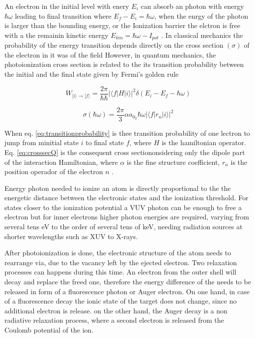 An electron in the initial level with enery $E_{i}$ can absorb an photon with energy $\hbar \omega$ leading to final transition where $E_{f}-E_{i}=\hbar \omega$, when the enrgy of the photon is larger than the bounding energy, or the Ionization barrier the elctron is free with a the remainin kinetic energy $E_{kin} = \hbar \omega - I_{pot}$ \cite{becker_vuv_1996}.
In classical mechanics the probability of the energy transition depends directly on the cross section $(\sigma)$ of the electron in it was of the field However,  in  quantum  mechanics,  the photoionization cross section is related to the its transition probability between the initial and the final state given by Fermi’s golden rule

 \begin{equation} \label{eq:transitionprobability}
W_{|i\rangle \rightarrow |f\rangle} = \frac{2\pi}{\hbar\hbar} |\langle f|H|i\rangle|^{2} \delta(E_{i} - E_{f}-\hbar\omega)
 \end{equation}
 
 \begin{equation}\label{eq:crosssecQ}
 \sigma(\hbar\omega) = \dfrac{2\pi}{3} \alpha a_{0}_{2} \hbar\omega |\langle f|r_{n}|i\rangle|^{2}
 \end{equation}
 


When eq. \ref{eq:transitionprobability} is thee transition probability of one lectron to jump from minitial state $i$ to final state $f$, where $H$ is the hamiltonian operator. Eq. \ref{eq:crosssecQ} is the consequent cross sectiononsidering only the dipole part of the interaction Hamiltonian, where $\alpha$ is the fine structure coefficient, $r_{n}$ is the position operador of the electron $n$ \cite{fermi_quantum_1932}.

Energy photon needed to ionize an atom is directly proportional to the  the energetic distance between the electronic states and the ionization threshold. For  states closer to the ionization potential a  VUV photon can be enough to free a electron but for inner electrons  higher photon energies are required, varying from several tens eV to the order of several tens of keV, needing radiation sources at shorter wavelengths such as XUV to X-rays.\cite{becker_vuv_1996}

After photoionization is done, the electronic structure of the atom needs to rearrange via, due to the vacancy left by the ejected electron. Two relaxation processes can happens during this time. An electron from the outer shell will decay and replace the freed one, therefore the energy difference of the needs to be released in form of a fluorescence photon or Auger electron. On one hand, in case of a fluorescence decay the ionic state of the target does not change, since no additional electron is release. on the other hand, the Auger decay is a non radiative relaxation process, where a second electron is released from the Coulomb potential of the ion.

